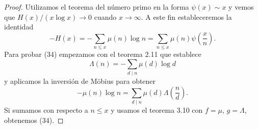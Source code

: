 \documentclass[12pt,a4paper]{book}
\begin{document}
    \begin{proof}
        Utilizamos el teorema del número primo en la forma $\psi(x)\sim x$ y vemos que
        $H(x)/(x\log x)\to0$ cuando $x\to\infty$. A este fin estableceremos la
        identidad
        \begin{equation}
            -H(x)=-\sum_{n\leq x}\mu(n)\log n=\sum_{n\leq x}\mu(n)\psi\left(\frac{x}{n}\right).
        \end{equation}
        Para probar (34) empezamos con el teorema 2.11 que establece
        \begin{equation*}
            \Lambda(n)=-\sum_{d\mid n}\mu(d)\log d
        \end{equation*}
        y aplicamos la inversión de Möbius para obtener
        \begin{equation*}
            -\mu(n)\log n=\sum_{d\mid n}\mu(d)\Lambda\left(\frac{n}{d}\right).
        \end{equation*}
        Si sumamos con respecto a $n\leq x$ y usamos el teorema 3.10 con $f=\mu$,
        $g=\Lambda$, obtenemos (34).


\end{proof}
\end{document}
